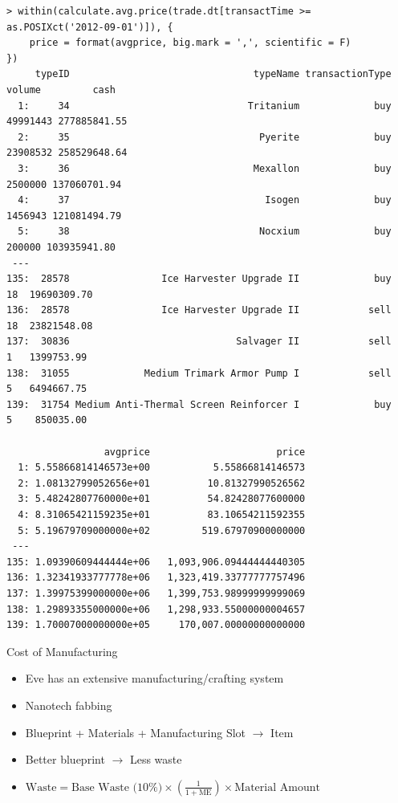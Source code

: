 \documentclass[12pt]{beamer}
\begin{document}
\begin{frame}[fragile]
\begin{verbatim}
> within(calculate.avg.price(trade.dt[transactTime >= as.POSIXct('2012-09-01')]), {
    price = format(avgprice, big.mark = ',', scientific = F)
})
     typeID                                typeName transactionType   volume         cash
  1:     34                               Tritanium             buy 49991443 277885841.55
  2:     35                                 Pyerite             buy 23908532 258529648.64
  3:     36                                Mexallon             buy  2500000 137060701.94
  4:     37                                  Isogen             buy  1456943 121081494.79
  5:     38                                 Nocxium             buy   200000 103935941.80
 ---
135:  28578                Ice Harvester Upgrade II             buy       18  19690309.70
136:  28578                Ice Harvester Upgrade II            sell       18  23821548.08
137:  30836                             Salvager II            sell        1   1399753.99
138:  31055             Medium Trimark Armor Pump I            sell        5   6494667.75
139:  31754 Medium Anti-Thermal Screen Reinforcer I             buy        5    850035.00

                 avgprice                      price
  1: 5.55866814146573e+00           5.55866814146573
  2: 1.08132799052656e+01          10.81327990526562
  3: 5.48242807760000e+01          54.82428077600000
  4: 8.31065421159235e+01          83.10654211592355
  5: 5.19679709000000e+02         519.67970900000000
 ---
135: 1.09390609444444e+06   1,093,906.09444444440305
136: 1.32341933777778e+06   1,323,419.33777777757496
137: 1.39975399000000e+06   1,399,753.98999999999069
138: 1.29893355000000e+06   1,298,933.55000000004657
139: 1.70007000000000e+05     170,007.00000000000000
\end{verbatim}
\end{frame}


\begin{frame}[fragile]{Cost of Manufacturing}

\begin{itemize}
\item<2-> Eve has an extensive manufacturing/crafting system
\item<3-> Nanotech fabbing
\item<4-> Blueprint + Materials + Manufacturing Slot $\rightarrow$ Item
\item<5-> Better blueprint $\rightarrow$ Less waste
\item<6-> $\text{Waste} = \text{Base Waste (10\%)} \times \left(\frac{1}{1 + \text{ME}}\right) \times \text{Material Amount}$
\end{itemize}

\end{frame}
\end{document}
